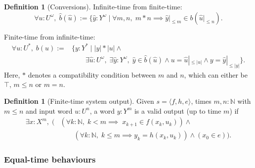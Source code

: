 \documentclass[11pt,a4paper]{article}
\newcommand{\N}{\mathbb{N}}
\newcommand{\len}[1]{{|#1|}}
\newcommand{\hB}{\widehat{b}}
\newcommand{\hu}{\hat{u}}
\newcommand{\hy}{\hat{y}}
\theoremstyle{theorem}
\theoremstyle{definition}
\newtheorem{definition}[theorem]{Definition}
\theoremstyle{remark}
\begin{document}
\begin{definition}[Conversions]
Infinite-time from finite-time:
\[ \forall u:U^\omega,\; \hB(\hu) := \{ \hy : Y^\omega \mid \forall m,n,\; m \ast n \implies  \hy|_{\leq m} \in b(\hu|_{\leq n}) . \]
\par
Finite-time from infinite-time:
\[ \begin{aligned}
\forall u:U^*,\; b(u) := & \{ y: Y^* \mid \len{y}\ast \len{u} \wedge {} \\ & \qquad \exists \hu:U^\omega,\; \exists\hy:Y^\omega,\; \hy\in \hB(\hu) \wedge u=\hu|_{\leq\len{u}} \wedge y=\hy|_{\leq\len{y}} \}.
\end{aligned} \]
Here, $\ast$ denotes a compatibility condition between $m$ and $n$, which can either be $\top$, $m\leq n$ or $m=n$.

\end{definition}


\begin{definition}[Finite-time system output]
Given $s=\langle f,h,e\rangle$, times $m,n:\N$ with $m\leq n$ and input word $u:U^n$, a word $y:Y^m$ is a valid output (up to time $m$) if
\[ \begin{aligned}
  \exists x : X^m,\;\bigl(&(\forall k:\N,\; k< m \implies \;x_{k+1}\in f(x_k,u_k)) \wedge \mbox{} \\ &\qquad (\forall k:\N,\; k\leq m \implies y_k = h(x_k,u_k)) \wedge (x_0 \in e ) \bigr) .
\end{aligned} \]
\end{definition}



\newpage

\subsubsection{Equal-time behaviours}
\end{document}
